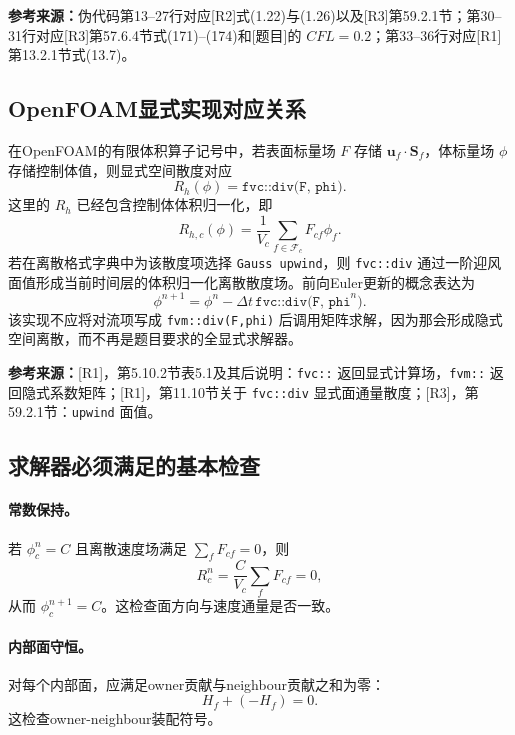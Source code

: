 \documentclass[UTF8,12pt,a4paper]{ctexart}
\numberwithin{equation}{section}
\newcommand{\Rone}{\textnormal{[R1]}}
\newcommand{\Rtwo}{\textnormal{[R2]}}
\newcommand{\Rthree}{\textnormal{[R3]}}
\newcommand{\Task}{\textnormal{[题目]}}
\newcommand{\source}[1]{%
  \par\smallskip
  \noindent\colorbox{sourcebg}{%
    \parbox{0.955\linewidth}{\footnotesize\color{sourcegray}\textbf{参考来源：}#1}%
  }
  \par\smallskip
}
\begin{document}
\source{伪代码第13--27行对应\Rtwo 式(1.22)与(1.26)以及\Rthree 第59.2.1节；第30--31行对应\Rthree 第57.6.4节式(171)--(174)和\Task 的 $CFL=0.2$；第33--36行对应\Rone 第13.2.1节式(13.7)。}

\subsection{OpenFOAM显式实现对应关系}

在OpenFOAM的有限体积算子记号中，若表面标量场 $F$ 存储 $\bm u_f\cdot\bm S_f$，体标量场 $\phi$ 存储控制体值，则显式空间散度对应
\begin{equation}
  R_h(\phi)=\texttt{fvc::div(F, phi)}.
  \label{eq:fvcdiv}
\end{equation}
这里的 $R_h$ 已经包含控制体体积归一化，即
\begin{equation}
  R_{h,c}(\phi)
  =\frac{1}{V_c}\sum_{f\in\mathcal F_c}F_{cf}\phi_f.
  \label{eq:fvcdiv_normalized}
\end{equation}
若在离散格式字典中为该散度项选择 \texttt{Gauss upwind}，则 \texttt{fvc::div} 通过一阶迎风面值形成当前时间层的体积归一化离散散度场。前向Euler更新的概念表达为
\begin{equation}
  \boxed{
  \phi^{n+1}
  =\phi^n-\Delta t\,\texttt{fvc::div(F, phi}^{n}\texttt{)}
  }.
  \label{eq:openfoam_update}
\end{equation}
该实现不应将对流项写成 \texttt{fvm::div(F,phi)} 后调用矩阵求解，因为那会形成隐式空间离散，而不再是题目要求的全显式求解器。

\source{\Rone，第5.10.2节表5.1及其后说明：\texttt{fvc::} 返回显式计算场，\texttt{fvm::} 返回隐式系数矩阵；\Rone，第11.10节关于 \texttt{fvc::div} 显式面通量散度；\Rthree，第59.2.1节：\texttt{upwind} 面值。}

\subsection{求解器必须满足的基本检查}

\paragraph{常数保持。}
若 $\phi_c^n=C$ 且离散速度场满足 $\sum_fF_{cf}=0$，则
\begin{equation}
  R_c^n=\frac{C}{V_c}\sum_fF_{cf}=0,
\end{equation}
从而 $\phi_c^{n+1}=C$。这检查面方向与速度通量是否一致。

\paragraph{内部面守恒。}
对每个内部面，应满足owner贡献与neighbour贡献之和为零：
\begin{equation}
  H_f+(-H_f)=0.
\end{equation}
这检查owner-neighbour装配符号。
\end{document}
